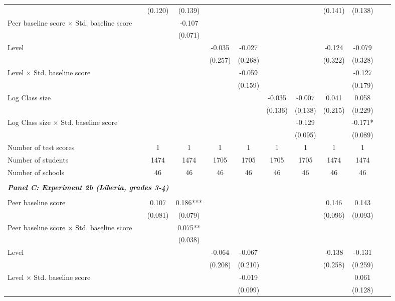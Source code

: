 \begin{center}
\begin{scriptsize}
\begin{threeparttable}
\begin{tabular} {@{} l l c c c c c c c c c c  @{}}
                 &  & (0.120) & (0.139) &  &  &  &  & (0.141) & (0.138) \\
Peer baseline score $\times$ Std. baseline score &  &  & -0.107 &  &  &  &  &  &  \\
                 &  &  & (0.071) &  &  &  &  &  &  \\
Level &  &  &  & -0.035 & -0.027 &  &  & -0.124 & -0.079 \\
                 &  &  &  & (0.257) & (0.268) &  &  & (0.322) & (0.328) \\
Level $\times$ Std. baseline score &  &  &  &  & -0.059 &  &  &  & -0.127 \\
                 &  &  &  &  & (0.159) &  &  &  & (0.179) \\
Log Class size &  &  &  &  &  & -0.035 & -0.007 & 0.041 & 0.058 \\
                 &  &  &  &  &  & (0.136) & (0.138) & (0.215) & (0.229) \\
Log Class size $\times$ Std. baseline score &  &  &  &  &  &  & -0.129 &  & -0.171* \\
                 &  &  &  &  &  &  & (0.095) &  & (0.089) \\
\midrule
Number of test scores &  & 1 & 1 & 1 & 1 & 1 & 1 & 1 & 1 \\
Number of students &  & 1474 & 1474 & 1705 & 1705 & 1705 & 1705 & 1474 & 1474 \\
Number of schools &  & 46 & 46 & 46 & 46 & 46 & 46 & 46 & 46 \\
 \midrule
\\
\multicolumn{3}{l}{\textbf{\textit{Panel C: Experiment 2b (Liberia, grades 3-4)}}} \\
\\
Peer baseline score &  & 0.107 & 0.186*** &  &  &  &  & 0.146 & 0.143 \\
                 &  & (0.081) & (0.079) &  &  &  &  & (0.096) & (0.093) \\
Peer baseline score $\times$ Std. baseline score &  &  & 0.075** &  &  &  &  &  &  \\
                 &  &  & (0.038) &  &  &  &  &  &  \\
Level &  &  &  & -0.064 & -0.067 &  &  & -0.138 & -0.131 \\
                 &  &  &  & (0.208) & (0.210) &  &  & (0.258) & (0.259) \\
Level $\times$ Std. baseline score &  &  &  &  & -0.019 &  &  &  & 0.061 \\
                 &  &  &  &  & (0.099) &  &  &  & (0.128) \\

\end{tabular}
\end{threeparttable}
\end{scriptsize}
\end{center}
